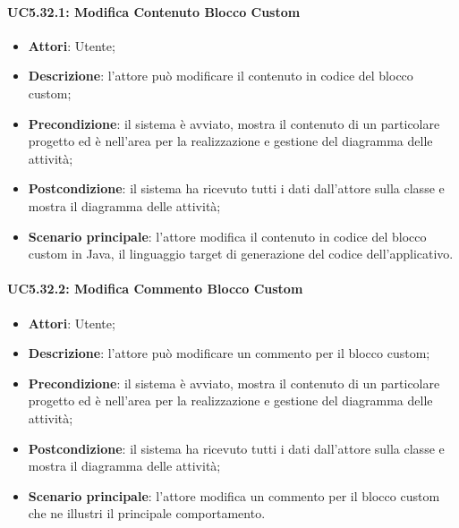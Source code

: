 \paragraph{UC5.32.1: Modifica Contenuto Blocco Custom}
\label{UC5.32.1}
\begin{itemize}
	\item \textbf{Attori}: Utente;
	\item \textbf{Descrizione}: l'attore può modificare il contenuto in codice del blocco custom;
	\item \textbf{Precondizione}: il sistema è avviato, mostra il contenuto di un particolare progetto ed è nell'area per la realizzazione e gestione del diagramma delle attività;
	\item \textbf{Postcondizione}: il sistema ha ricevuto tutti i dati dall'attore sulla classe e mostra il diagramma delle attività;
	\item \textbf{Scenario principale}: l'attore modifica il contenuto in codice del blocco custom in Java, il linguaggio target di generazione del codice dell'applicativo.
\end{itemize}

\paragraph{UC5.32.2: Modifica Commento Blocco Custom}
\label{UC5.32.2}
\begin{itemize}
	\item \textbf{Attori}: Utente;
	\item \textbf{Descrizione}: l'attore può modificare un commento per il blocco custom;
	\item \textbf{Precondizione}: il sistema è avviato, mostra il contenuto di un particolare progetto ed è nell'area per la realizzazione e gestione del diagramma delle attività;
	\item \textbf{Postcondizione}: il sistema ha ricevuto tutti i dati dall'attore sulla classe e mostra il diagramma delle attività;
	\item \textbf{Scenario principale}: l'attore modifica un commento per il blocco custom che ne illustri il principale comportamento.
\end{itemize}
